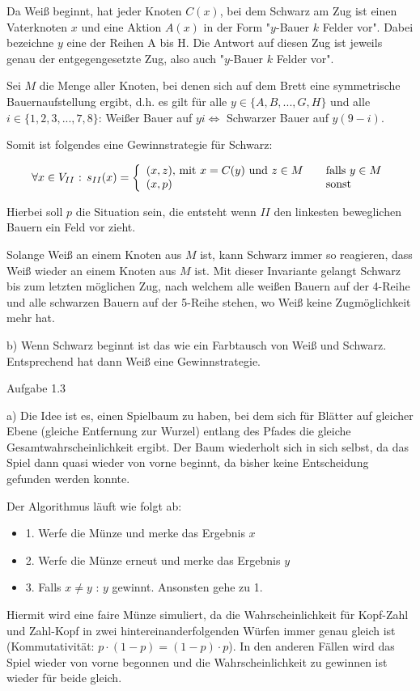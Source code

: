\documentclass{scrartcl}
\begin{document}
Da Weiß beginnt, hat jeder Knoten $C(x)$, bei dem Schwarz am Zug ist einen Vaterknoten $x$ und eine Aktion
$A(x)$ in der Form "$y$-Bauer $k$ Felder vor". Dabei bezeichne $y$ eine der Reihen A bis H. Die Antwort auf
diesen Zug ist jeweils genau der entgegengesetzte Zug, also auch "$y$-Bauer $k$ Felder vor".

Sei $M$ die Menge aller Knoten, bei denen sich auf dem Brett eine symmetrische Bauernaufstellung ergibt, d.h.
es gilt für alle $y \in \{A, B, ..., G, H\}$ und alle $i \in \{1, 2, 3, ..., 7, 8\}$:
Weißer Bauer auf $yi \Leftrightarrow$ Schwarzer Bauer auf $y(9-i)$.

Somit ist folgendes eine Gewinnstrategie für Schwarz: \newline

\[ \forall x \in V_{II}\text{ : }s_{II}(x) = \left\{
\begin{array}{l l}
(x, z) \text{, mit }x = C(y) \text{ und } z \in M & \quad \text{falls } y \in M\\
(x, p) & \quad \text{sonst}
\end{array} \right.\] 

Hierbei soll $p$ die Situation sein, die entsteht wenn $II$ den linkesten beweglichen Bauern
ein Feld vor zieht.

Solange Weiß an einem Knoten aus $M$ ist, kann Schwarz immer so reagieren, dass Weiß wieder an einem Knoten aus
$M$ ist. Mit dieser Invariante gelangt Schwarz bis zum letzten möglichen Zug, nach welchem alle weißen Bauern
auf der 4-Reihe und alle schwarzen Bauern auf der 5-Reihe stehen, wo Weiß keine Zugmöglichkeit mehr hat.\newline

b) Wenn Schwarz beginnt ist das wie ein Farbtausch von Weiß und Schwarz. Entsprechend hat dann Weiß eine
Gewinnstrategie.

\clearpage
\begin{Large}
Aufgabe 1.3\\[0.0cm]
\end{Large}

a) Die Idee ist es, einen Spielbaum zu haben, bei dem sich für Blätter auf gleicher Ebene (gleiche Entfernung zur
Wurzel) entlang des Pfades die gleiche Gesamtwahrscheinlichkeit ergibt. Der Baum wiederholt sich in sich selbst,
da das Spiel dann quasi wieder von vorne beginnt, da bisher keine Entscheidung gefunden werden konnte.

Der Algorithmus läuft wie folgt ab:
\begin{itemize}
\item{1. Werfe die Münze und merke das Ergebnis $x$}
\item{2. Werfe die Münze erneut und merke das Ergebnis $y$}
\item{3. Falls $x \neq y$ : $y$ gewinnt. Ansonsten gehe zu 1.}
\end{itemize}

Hiermit wird eine faire Münze simuliert, da die Wahrscheinlichkeit für Kopf-Zahl und Zahl-Kopf in zwei
hintereinanderfolgenden Würfen immer genau gleich ist (Kommutativität: $p \cdot (1-p) = (1-p) \cdot p$). In den
anderen Fällen wird das Spiel wieder von vorne begonnen und die Wahrscheinlichkeit zu gewinnen ist wieder für
beide gleich.
\end{document}
